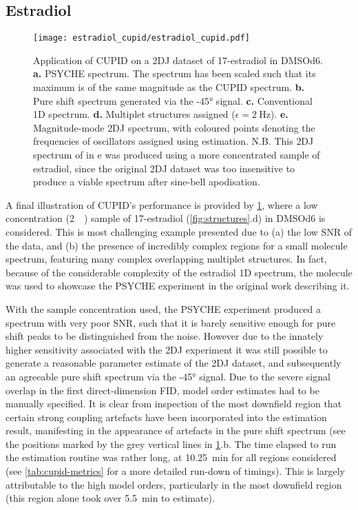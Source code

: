 \subsection{Estradiol}
\begin{figure}
    \texttt{[image: estradiol\_cupid/estradiol\_cupid.pdf]}%
    \caption[
        Application of \acs{CUPID} on a 17\textbeta-estradiol dataset.
    ]{
        Application of \acs{CUPID} on a \ac{2DJ} dataset of 17\textbeta-estradiol
        in \acs{DMSOd6}.
        \textbf{a.} \acs{PSYCHE} spectrum.
        The spectrum has been scaled such that its maximum is of the same
        magnitude as the \acs{CUPID} spectrum.
        \textbf{b.} Pure shift spectrum generated via the \ang{-45} signal.
        \textbf{c.} Conventional \ac{1D} spectrum.
        \textbf{d.} Multiplet structures assigned ($\epsilon =
        \qty{2}{\hertz}$).
        \textbf{e.} Magnitude-mode \ac{2DJ} spectrum, with coloured points
        denoting the frequencies of oscillators assigned using estimation.
        N.B. This \ac{2DJ} spectrum of in e was produced using a more
        concentrated sample of estradiol, since the original \ac{2DJ} dataset
        was too insensitive to produce a viable spectrum after sine-bell
        apodisation.
    }
    \label{fig:estradiol-cupid}%
\end{figure}

A final illustration of \ac{CUPID}'s performance is provided by
\cref{fig:estradiol-cupid},
where a low concentration (\qty{2}{\milli\molar}) sample of
17\textbeta-estradiol (\cref{fig:structures}.d) in \acs{DMSOd6} is
considered. This is most challenging example presented due
to (a) the low \ac{SNR} of the data, and (b) the presence of incredibly complex
regions for a small molecule spectrum, featuring many complex overlapping
multiplet structures. In fact, because of the considerable complexity
of the estradiol \ac{1D} spectrum, the molecule was used to showcase the
\ac{PSYCHE} experiment in the original work describing
it\cite{Foroozandeh2014}.

With the sample concentration used, the
\ac{PSYCHE} experiment produced a spectrum with very poor
\ac{SNR}, such that it is barely sensitive enough for pure shift peaks to be
distinguished from the noise. However due to the innately higher
sensitivity associated with the \ac{2DJ} experiment it was still possible to
generate a reasonable parameter estimate of the \ac{2DJ} dataset, and
subsequently an agreeable pure shift spectrum via the \ang{-45} signal. Due to
the severe signal overlap in the first
direct-dimension \ac{FID}, model order estimates had to be
manually specified. It is clear from inspection of the most downfield region
that certain strong coupling artefacts have been incorporated into the
estimation result, manifesting in the appearance of artefacts in the pure shift
spectrum (see the positions marked by the grey vertical lines in
\cref{fig:estradiol-cupid}.b.
The time elapsed to run the estimation routine was rather
long, at \qty{10.25}{\minute} for all regions considered (see
\cref{tab:cupid-metrics} for a more detailed run-down of timings). This is
largely attributable to the high model orders, particularly in the most
downfield region (this region alone took over \qty{5.5}{\minute} to estimate).
